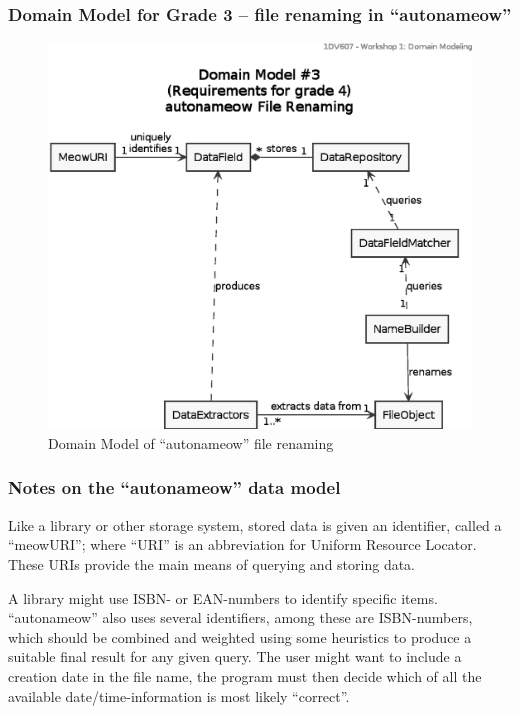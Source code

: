 \subsubsection{Domain Model for Grade 3 -- file renaming in ``autonameow''}
\begin{figure}[htbp]
  \centering
  \includegraphics[width=\linewidth]{uml/domain-model_3a.eps}
  \caption{Domain Model of ``autonameow'' file renaming}
  \label{fig:uml-domain3a}
\end{figure}


\subsubsection{Notes on the ``autonameow'' data model}
Like a library or other storage system, stored data is given an identifier,
called a ``meowURI''; where ``URI'' is an abbreviation for Uniform Resource
Locator. These URIs provide the main means of querying and storing data.

A library might use ISBN- or EAN-numbers to identify specific items.
``autonameow'' also uses several identifiers, among these are ISBN-numbers,
which should be combined and weighted using some heuristics to produce a
suitable final result for any given query.
The user might want to include a creation date in the file name, the program
must then decide which of all the available date/time-information is most
likely ``correct''.


